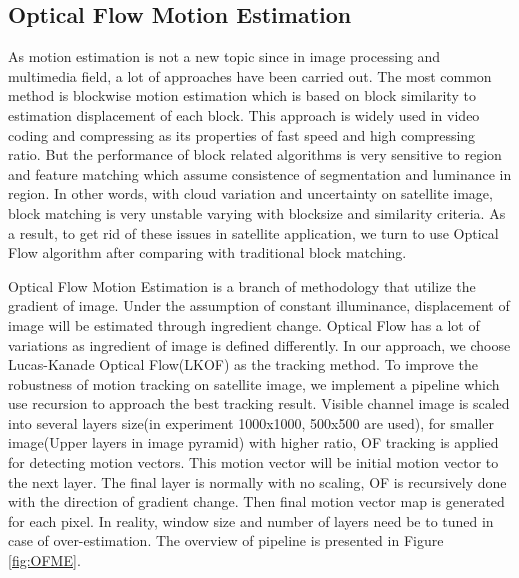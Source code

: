 \documentclass[conference]{IEEEtran}
\begin{document}
\subsection{Optical Flow Motion Estimation}
\label{subsec:OF}
As motion estimation is not a new topic since in image processing and multimedia
field, a lot of approaches have been carried out. The most common method is
blockwise motion estimation which is based on block similarity to estimation
displacement of each block. This approach is widely used in video coding and
compressing as its properties of fast speed and high compressing ratio. But the
performance of block related algorithms is very sensitive to region and feature
matching which assume consistence of segmentation and luminance in region. In
other words, with cloud variation and uncertainty on satellite image, block
matching is very unstable varying with blocksize and similarity criteria. As a
result, to get rid of these issues in satellite application, we turn to use
Optical Flow algorithm after comparing with traditional block matching.

Optical Flow Motion Estimation is a branch of methodology that utilize the
gradient of image. Under the assumption of constant illuminance, displacement of
image will be estimated through ingredient change. Optical Flow has a lot of
variations as ingredient of image is defined differently. In our approach, we
choose Lucas-Kanade Optical Flow(LKOF)\cite{lucas1981iterative} as the tracking method. To
improve the robustness of motion tracking on satellite image, we implement a pipeline which
use recursion to approach the best tracking result. Visible channel image is
scaled into several layers size(in experiment 1000x1000, 500x500 are used), for
smaller image(Upper layers in image pyramid) with higher ratio, OF tracking is
applied for detecting motion vectors. This motion vector will be initial motion
vector to the next layer. The final layer is normally with no scaling, OF is
recursively done with the direction of gradient change. Then final motion vector
map is generated for each pixel. In reality, window size and number of layers
need be to tuned in case of over-estimation. The overview of pipeline is
presented in Figure \ref{fig:OFME}.
\end{document}

